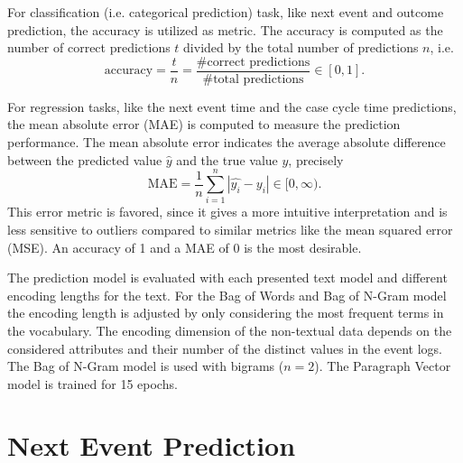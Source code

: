 For classification (i.e. categorical prediction) task, like next event and outcome prediction, the accuracy is utilized as metric.
The accuracy is computed as the number of correct predictions $t$ divided by the total number of predictions $n$, i.e. 
\begin{equation*}
	\textrm{accuracy} = \dfrac{t}{n} = \dfrac{\textrm{\# correct predictions}}{\textrm{\# total predictions}} \in [0,1].
\end{equation*}

For regression tasks, like the next event time and the case cycle time predictions, the mean absolute error (MAE) is computed to measure the prediction performance. The mean absolute error indicates the average absolute difference between the predicted value $\hat{y}$ and the true value $y$,  precisely
\begin{equation*}
	\textrm{MAE} = \dfrac{1}{n}\sum_{i=1}^{n}|\hat{y_i} - y_i| \in [0, \infty).
\end{equation*}
This error metric is favored, since it gives a more intuitive interpretation and is less sensitive to outliers compared to similar metrics like the mean squared error (MSE).
An accuracy of 1 and a MAE of 0 is the most desirable.

The prediction model is evaluated with each presented text model and different encoding lengths for the text.
For the Bag of Words and Bag of N-Gram model the encoding length is adjusted by only considering the most frequent terms in the vocabulary.
The encoding dimension of the non-textual data depends on the considered attributes and their number of the distinct values in the event logs.
The Bag of N-Gram model is used with bigrams ($n=2$).
The Paragraph Vector model is trained for 15 epochs.

\section{Next Event Prediction}


